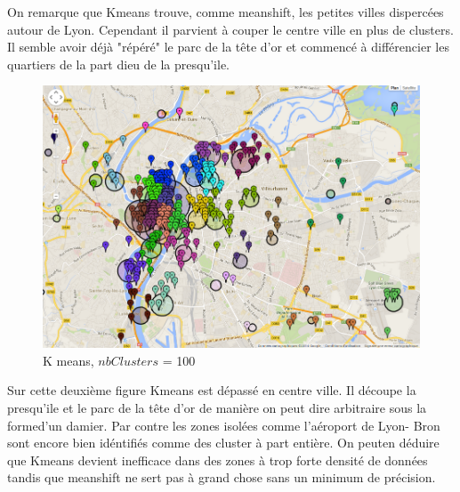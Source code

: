 On remarque que Kmeans trouve, comme meanshift, les petites villes dispercées autour de Lyon. Cependant il parvient à couper le centre ville en plus de clusters. Il semble avoir déjà "répéré" le parc de la tête d'or et commencé à différencier les quartiers de la part dieu de la presqu'ile.
\\

\begin{figure}[!h]
    \centering
    \includegraphics[width=16cm]{images/Kmeans2.png}
    \caption{K means, $nbClusters $ = 100}
    \label{fig:Kmeans}
\end{figure}

Sur cette deuxième figure Kmeans est dépassé en centre ville. Il découpe la presqu'ile et le parc de la tête d'or de manière on peut dire arbitraire sous la formed'un damier.
Par contre les zones isolées comme l'aéroport de Lyon- Bron sont encore bien idéntifiés comme des cluster à part entière.
On peuten déduire que Kmeans devient inefficace dans des zones à trop forte densité de données tandis que meanshift ne sert pas à grand chose sans un minimum de précision.
